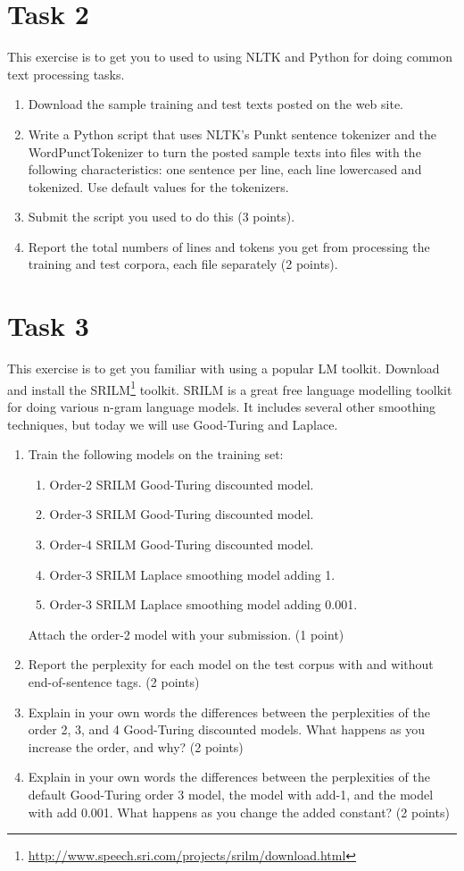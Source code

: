 \documentclass[paper=a4, fontsize=11pt]{scrartcl} %
\numberwithin{equation}{section} %
\numberwithin{figure}{section} %
\numberwithin{table}{section} %
\begin{document}
\section*{Task 2}
This exercise is to get you to used to using NLTK and Python for doing
common text processing tasks.  

\begin{enumerate}
\item Download the sample training and test texts posted on the web site.
\item Write a Python script that uses NLTK's Punkt sentence tokenizer
  and the WordPunctTokenizer to turn the posted sample texts into
  files with the following characteristics: one sentence per line, each
  line lowercased and tokenized.  Use default values for the tokenizers.
\item Submit the script you used to do this (3 points).
\item Report the total numbers of lines and tokens you get from 
  processing the training and test corpora, each file separately (2 points).
\end{enumerate}

\section*{Task 3}
This exercise is to get you familiar with using a popular LM
toolkit. Download and install the
SRILM\footnote{\url{http://www.speech.sri.com/projects/srilm/download.html}}
 toolkit. SRILM is a great free language modelling toolkit for doing
various n-gram language models. It
includes several other smoothing techniques, but today we will use Good-Turing 
and Laplace.
\begin{enumerate}
\item Train the following models on the training set:
  \begin{enumerate}
    \item Order-2 SRILM Good-Turing discounted model.
    \item Order-3 SRILM Good-Turing discounted model.
    \item Order-4 SRILM Good-Turing discounted model.
    \item Order-3 SRILM Laplace smoothing model adding 1.
    \item Order-3 SRILM Laplace smoothing model adding 0.001.
  \end{enumerate}
  Attach the order-2 model with your submission. (1 point)
\item Report the perplexity for each model on the test corpus with and 
  without end-of-sentence tags. (2 points)
\item Explain in your own words the differences between the
  perplexities of the order 2, 3, and 4 Good-Turing discounted
  models. What happens as you increase the order, and why? (2 points)
\item Explain in your own words the differences between the
  perplexities of the default Good-Turing order 3 model, the model
  with add-1, and the model with add 0.001.  What happens as you
  change the added constant? (2 points)
\end{enumerate}
\end{document}
